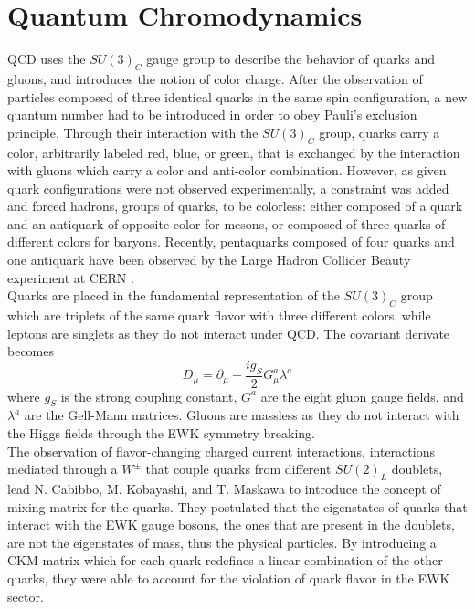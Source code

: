   \section{Quantum Chromodynamics}

    QCD uses the $ SU(3)_C $ gauge group to describe the behavior of quarks and gluons, and introduces the notion of color charge. After the observation of particles composed of three identical quarks in the same spin configuration, a new quantum number had to be introduced in order to obey Pauli's exclusion principle. Through their interaction with the $ SU(3)_C $ group, quarks carry a color, arbitrarily labeled red, blue, or green, that is exchanged by the interaction with gluons which carry a color and anti-color combination. However, as given quark configurations were not observed experimentally, a constraint was added and forced hadrons, groups of quarks, to be colorless: either composed of a quark and an antiquark of opposite color for mesons, or composed of three quarks of different colors for baryons. Recently, pentaquarks composed of four quarks and one antiquark have been observed by the Large Hadron Collider Beauty experiment at CERN \cite{Aaij:2015tga}. \\

    Quarks are placed in the fundamental representation of the $ SU(3)_C $ group which are triplets of the same quark flavor with three different colors, while leptons are singlets as they do not interact under QCD. The covariant derivate becomes
    \begin{equation}
      D_\mu = \partial_\mu - \frac{i g_S}{2} G^a_\mu \lambda^a
    \end{equation}
    where $ g_S $ is the strong coupling constant, $ G^a $ are the eight gluon gauge fields, and $ \lambda^a $ are the Gell-Mann matrices. Gluons are massless as they do not interact with the Higgs fields through the EWK symmetry breaking. \\

    The observation of flavor-changing charged current interactions, interactions mediated through a $ W^\pm $ that couple quarks from different $ SU(2)_L $ doublets, lead N. Cabibbo, M. Kobayashi, and T. Maskawa to introduce the concept of mixing matrix for the quarks. They postulated that the eigenstates of quarks that interact with the EWK gauge bosons, the ones that are present in the doublets, are not the eigenstates of mass, thus the physical particles. By introducing a CKM matrix which for each quark redefines a linear combination of the other quarks, they were able to account for the violation of quark flavor in the EWK sector.


